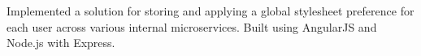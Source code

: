 \documentclass[9pt,letter]{altacv}
\begin{document}
\divider

Implemented a solution for storing and applying a global stylesheet preference for each user across various internal microservices. Built using AngularJS and Node.js with Express.

%

\clearpage
\end{document}
